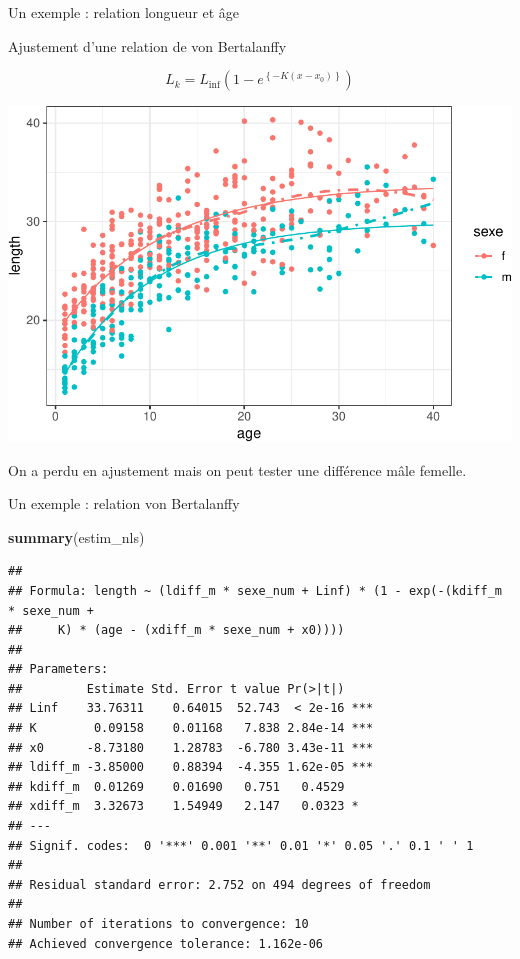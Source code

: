 \documentclass[10pt,ignorenonframetext,]{beamer}
\newenvironment{Shaded}{\begin{snugshade}}{\end{snugshade}}
\newcommand{\KeywordTok}[1]{\textcolor[rgb]{0.13,0.29,0.53}{\textbf{#1}}}
\newcommand{\NormalTok}[1]{#1}
\begin{document}
\begin{frame}{Un exemple : relation longueur et âge}

Ajustement d'une relation de von Bertalanffy

\[L_k = L_{\inf} \left ( 1 - e^{ \left \lbrace - K ( x - x_0 ) \right\rbrace } \right) \]

\scriptsize

\begin{center}\includegraphics[width=.7\textwidth]{figures/unnamed-chunk-4-1} \end{center}

\normalsize

On a perdu en ajustement mais on peut tester une différence mâle
femelle.

\end{frame}

\begin{frame}[fragile]{Un exemple : relation von Bertalanffy}

\scriptsize

\begin{Shaded}
\begin{Highlighting}[]
\KeywordTok{summary}\NormalTok{(estim_nls)}
\end{Highlighting}
\end{Shaded}

\color{gray}

\begin{verbatim}## 
## Formula: length ~ (ldiff_m * sexe_num + Linf) * (1 - exp(-(kdiff_m * sexe_num + 
##     K) * (age - (xdiff_m * sexe_num + x0))))
## 
## Parameters:
##         Estimate Std. Error t value Pr(>|t|)    
## Linf    33.76311    0.64015  52.743  < 2e-16 ***
## K        0.09158    0.01168   7.838 2.84e-14 ***
## x0      -8.73180    1.28783  -6.780 3.43e-11 ***
## ldiff_m -3.85000    0.88394  -4.355 1.62e-05 ***
## kdiff_m  0.01269    0.01690   0.751   0.4529    
## xdiff_m  3.32673    1.54949   2.147   0.0323 *  
## ---
## Signif. codes:  0 '***' 0.001 '**' 0.01 '*' 0.05 '.' 0.1 ' ' 1
## 
## Residual standard error: 2.752 on 494 degrees of freedom
## 
## Number of iterations to convergence: 10 
## Achieved convergence tolerance: 1.162e-06
\end{verbatim}

\color{black}

\normalsize

\end{frame}
\end{document}
